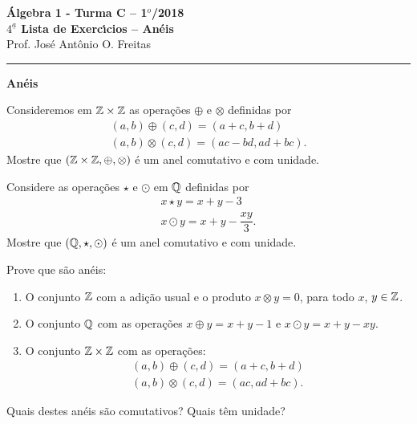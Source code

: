 \documentclass[12pt]{article}
\begin{document}


\begin{center}
 {\Large\bf {\'A}lgebra 1 - Turma C -- 1$^{o}$/2018} \\
 \vspace{9pt} {\large\bf $4^{\underline{a}}$ Lista de Exerc{\'\i}cios -- An\'eis}\\
 \vspace{9pt} Prof. Jos{\'e} Ant{\^o}nio O. Freitas
\end{center}
\hrule


\begin{center}
\Large{\bf An{\'e}is}
\end{center}

\vspace{.6cm}

\questao Consideremos em $\mathbb{Z} \times \mathbb{Z}$ as opera\c{c}\~oes $\oplus$ e $\otimes$ definidas por
\begin{align*}
	(a, b) \oplus (c, d) = (a + c, b + d)\\
	(a ,b) \otimes (c, d) = (ac - bd, ad + bc).
\end{align*}
Mostre que $(\mathbb{Z} \times \mathbb{Z}, \oplus, \otimes)$ \'e um anel comutativo e com unidade.

\vesp

\questao Considere as opera\c{c}\~oes $\star$ e $\odot$ em $\mathbb{Q}$ definidas por
\begin{align*}
	x \star y = x + y - 3\\
	x \odot y = x + y - \dfrac{xy}{3}.
\end{align*}
Mostre que $(\mathbb{Q}, \star, \odot)$ \'e um anel comutativo e com unidade.

\vesp

\questao Prove que s\~ao an\'eis:
\begin{enumerate}[label={\alph*})]
	\item O conjunto $\mathbb{Z}$ com a adi\c{c}\~ao usual e o produto $x \otimes y = 0$, para todo $x$, $y \in \mathbb{Z}$.
	\item O conjunto $\mathbb{Q}$ com as opera\c{c}\~oes $x \oplus y = x + y - 1$ e $x \odot y = x + y - xy$.
	\item O conjunto $\mathbb{Z} \times \mathbb{Z}$ com as opera\c{c}\~oes:
	\begin{align*}
		(a, b) \oplus (c, d) = (a + c, b + d)\\
		(a ,b) \otimes (c, d) = (ac, ad + bc).
	\end{align*}
\end{enumerate}
Quais destes an\'eis s\~ao comutativos? Quais t\^em unidade?
\end{document}

